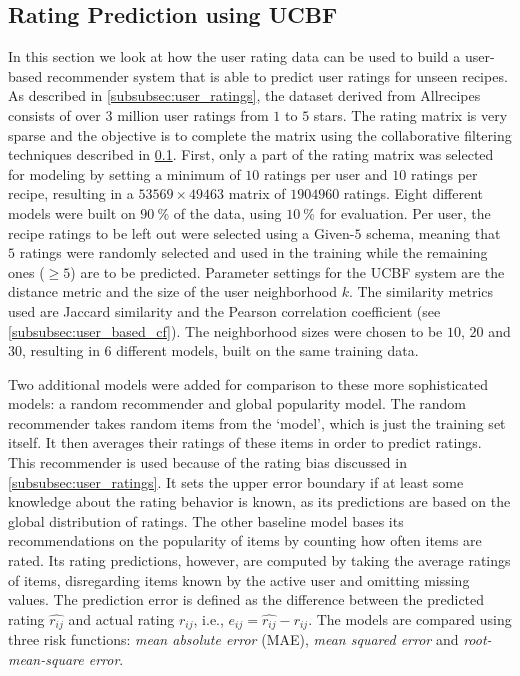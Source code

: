 

\subsection{Rating Prediction using UCBF}
\label{subsec:collaborative_filtering}

In this section we look at how the user rating data can be used to build a user-based recommender system that is able to predict user ratings for unseen recipes.
As described in \cref{subsubsec:user_ratings}, the dataset derived from Allrecipes consists of over $3$ million user ratings from $1$ to $5$ stars.
The rating matrix is very sparse and the objective is to complete the matrix using the collaborative filtering techniques described in \cref{subsec:collaborative_filtering}.
First, only a part of the rating matrix was selected for modeling by setting a minimum of $10$ ratings per user and $10$ ratings per recipe, resulting in a $\num{53569} \times \num{49463}$ matrix of $\num{1904960}$ ratings.
Eight different models were built on $\SI{90}{\percent}$ of the data, using $\SI{10}{\percent}$ for evaluation.
Per user, the recipe ratings to be left out were selected using a Given-$5$ schema, meaning that $5$ ratings were randomly selected and used in the training while the remaining ones ($\geq 5$) are to be predicted.
Parameter settings for the UCBF system are the distance metric and the size of the user neighborhood $k$.
The similarity metrics used are Jaccard similarity and the Pearson correlation coefficient (see \cref{subsubsec:user_based_cf}).
The neighborhood sizes were chosen to be $10$, $20$ and $30$, resulting in $6$ different models, built on the same training data.

Two additional models were added for comparison to these more sophisticated models: a random recommender and global popularity model.
The random recommender takes random items from the `model', which is just the training set itself.
It then averages their ratings of these items in order to predict ratings.
This recommender is used because of the rating bias discussed in \cref{subsubsec:user_ratings}.
It sets the upper error boundary if at least some knowledge about the rating behavior is known, as its predictions are based on the global distribution of ratings.
The other baseline model bases its recommendations on the popularity of items by counting how often items are rated.
Its rating predictions, however, are computed by taking the average ratings of items, disregarding items known by the active user and omitting missing values.
The prediction error is defined as the difference between the predicted rating $\hat{r_{ij}}$ and actual rating $r_{ij}$, i.e., $e_{ij}=\hat{r_{ij}}-r_{ij}$.
The models are compared using three risk functions: \emph{mean absolute error} (MAE), \emph{mean squared error} and \emph{root-mean-square error}.

